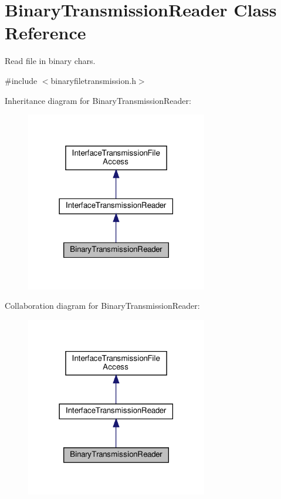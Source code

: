 \hypertarget{classBinaryTransmissionReader}{}\section{Binary\+Transmission\+Reader Class Reference}
\label{classBinaryTransmissionReader}


Read file in binary chars.  




{\ttfamily \#include $<$binaryfiletransmission.\+h$>$}



Inheritance diagram for Binary\+Transmission\+Reader\+:\nopagebreak
\begin{figure}[H]
\begin{center}
\leavevmode
\includegraphics[width=225pt]{d4/dda/classBinaryTransmissionReader__inherit__graph}
\end{center}
\end{figure}


Collaboration diagram for Binary\+Transmission\+Reader\+:\nopagebreak
\begin{figure}[H]
\begin{center}
\leavevmode
\includegraphics[width=225pt]{d5/da5/classBinaryTransmissionReader__coll__graph}
\end{center}
\end{figure}
